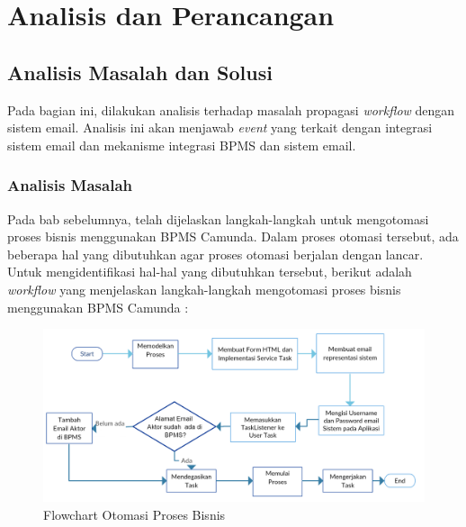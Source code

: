 \chapter{Analisis dan Perancangan}
\label{chap:analisisdanperancangan_hasilStudi}

\section{Analisis Masalah dan Solusi}
\label{sec:analisisdanperancangan_masalahdansolusi}
Pada bagian ini, dilakukan analisis terhadap masalah propagasi \textit{workflow} dengan sistem email. Analisis ini akan menjawab \textit{event} yang terkait dengan integrasi sistem email dan mekanisme integrasi BPMS dan sistem email.

\subsection{Analisis Masalah}
\label{analisisdanperancangan_analisismasalah}
Pada bab sebelumnya, telah dijelaskan langkah-langkah untuk mengotomasi proses bisnis menggunakan BPMS Camunda. Dalam proses otomasi tersebut, ada beberapa hal yang dibutuhkan agar proses otomasi berjalan dengan lancar. Untuk mengidentifikasi hal-hal yang dibutuhkan tersebut, berikut adalah \textit{workflow} yang menjelaskan langkah-langkah mengotomasi proses bisnis menggunakan BPMS Camunda :

		\begin{figure}[H]
			\centering
			\includegraphics[scale=0.4]{Gambar/Bab-4/HighLevelFlowchart}
			\caption{Flowchart Otomasi Proses Bisnis} 
			\label{fig:stepflowchart}
		\end{figure}

